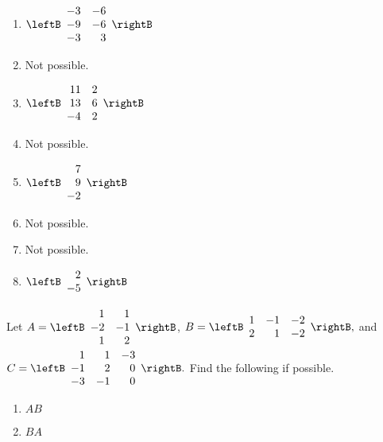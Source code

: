 \begin{enumialphparenastyle}
\begin{ex}
\begin{sol}
\begin{enumerate}
\item $\leftB
\begin{array}{rr}
-3 & -6 \\
-9 & -6 \\
-3 & 3 
\end{array}
\rightB$
\item Not possible. 
\item $\leftB
\begin{array}{rr}
11 & 2 \\
13 & 6 \\
-4 & 2
\end{array}
\rightB$
\item Not possible.
\item $\leftB
\begin{array}{r}
7 \\
9 \\
-2
\end{array}
\rightB$
\item Not possible. 
\item Not possible.
\item $\leftB
\begin{array}{r}
2 \\
-5
\end{array}
\rightB$
\end{enumerate}
\end{sol}
\end{ex}

\begin{ex} Let $A=\leftB
\begin{array}{rr}
1 & 1 \\
-2 & -1 \\
1 & 2
\end{array}
\rightB $, $B=\leftB
\begin{array}{rrr}
1 & -1 & -2 \\
2 & 1 & -2
\end{array}
\rightB ,$ and $C=\leftB
\begin{array}{rrr}
1 & 1 & -3 \\
-1 & 2 & 0 \\
-3 & -1 & 0
\end{array}
\rightB .$ Find the following if possible. 

\begin{enumerate}
\item $AB$

\item $BA$


\end{enumerate}
\end{ex}
\end{enumialphparenastyle}
